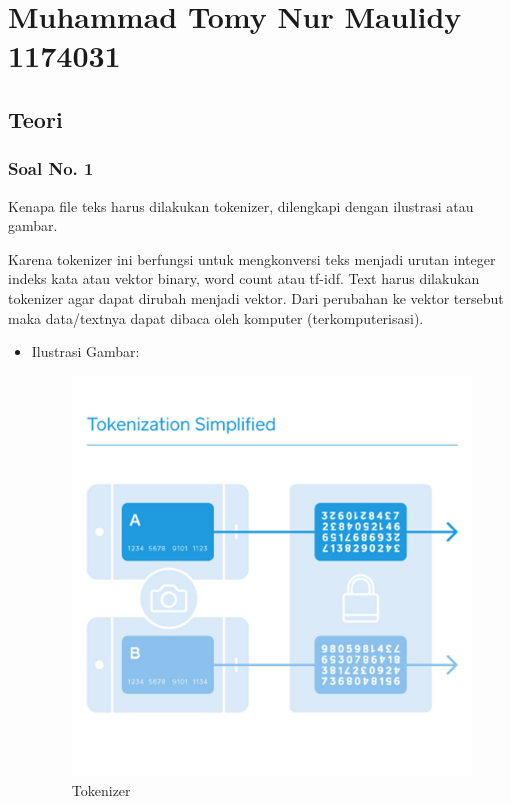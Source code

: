\section{Muhammad Tomy Nur Maulidy 1174031}
\subsection{Teori}
\subsubsection{Soal No. 1}
Kenapa file teks harus dilakukan tokenizer, dilengkapi dengan ilustrasi atau gambar.

Karena tokenizer ini berfungsi untuk mengkonversi teks menjadi urutan integer indeks kata atau vektor binary, word count atau tf-idf. Text harus dilakukan tokenizer agar dapat dirubah menjadi vektor. Dari perubahan ke vektor tersebut maka data/textnya dapat dibaca oleh komputer (terkomputerisasi).

\begin{itemize}
\item Ilustrasi Gambar:

\begin{figure}[!hbtp]
\centering
\includegraphics[scale=0.2]{figures/1174031/7/1.jpg}
\caption{Tokenizer}
\end{figure}

\end{itemize}

